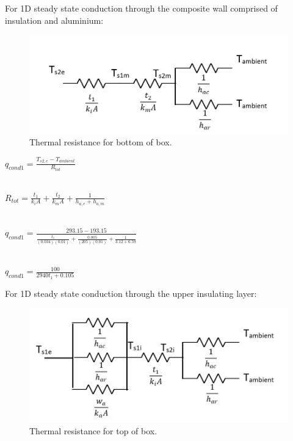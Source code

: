 For 1D steady state conduction through the composite wall comprised of insulation and aluminium: \\

	\begin{figure}[H]
    \centering
    \includegraphics[scale=0.6]{4-experiment-design/img/mechanical/thermalresistance1.JPG}
	\caption{Thermal resistance for bottom of box.}
	\label{fig:thermalresistance1}
	\end{figure}

\begin{center}
 $q_{cond1} = \frac{T_{s2,e}-T_{ambient}}{R_{tot}} $\\
 
 \ 
 
 $R_{tot} = \frac{t_{1}}{k_{i}A} + \frac{t_{2}}{k_{m}A} + \frac{1}{h_{a,e}+h_{a,m}} $\\
 
 \
 \ 
 
 $q_{cond1} = \frac{293.15 - 193.15}{\frac{t_{1}}{(0.034)(0.01)} + \frac{0.005}{(205)(0.01)} + \frac{1}{3.12+6.59}} $\\
 
 \  
 \ 
 
 $q_{cond1} = \frac{100}{2940t_{1}+0.105} $\\
 
\end{center}
 

For 1D steady state conduction through the upper insulating layer: \\

	\begin{figure}[H]
    \centering
    \includegraphics[scale=0.6]{4-experiment-design/img/mechanical/thermalresistance2.JPG}
	\caption{Thermal resistance for top of box.}
	\label{fig:thermalresistance2}
	\end{figure} 

